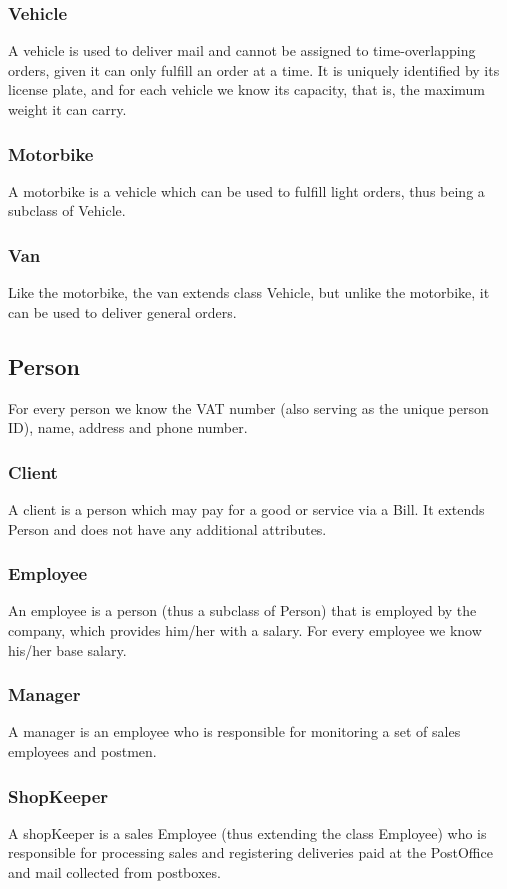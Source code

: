 \documentclass{report}[a4paper]
\theoremstyle{remark}
\begin{document}
\subsubsection{Vehicle}
A vehicle is used to deliver mail and cannot be assigned to time-overlapping orders, given it can only fulfill an order at a time. It is uniquely identified by its license plate, and for each vehicle we know its capacity, that is, the maximum weight it can carry.
\subsubsection{Motorbike}
A motorbike is a vehicle which can be used to fulfill light orders, thus being a subclass of Vehicle.
\subsubsection{Van}
Like the motorbike, the van extends class Vehicle, but unlike the motorbike, it can be used to deliver general orders.
\subsection{Person}
For every person we know the VAT number (also serving as the unique person ID), name, address and phone number.
\subsubsection{Client}
A client is a person which may pay for a good or service via a Bill. It extends Person and does not have any additional attributes.
\subsubsection{Employee}
An employee is a person (thus a subclass of Person) that is employed by the company, which provides him/her with a salary. For every employee we know his/her base salary.
\subsubsection{Manager}
A manager is an employee who is responsible for monitoring a set of sales employees and postmen.
\subsubsection{ShopKeeper}
A shopKeeper is a sales Employee (thus extending the class Employee) who is responsible for processing sales and registering deliveries paid at the PostOffice and mail collected from postboxes.
\end{document}
